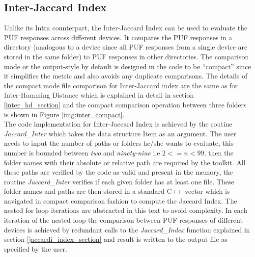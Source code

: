 \subsection{Inter-Jaccard Index}
Unlike its Intra counterpart, the Inter-Jaccard Index can be used to evaluate the PUF responses across different devices. It compares the PUF responses in a directory (analogous to a device since all PUF responses from a single device are stored in the same folder) to PUF responses in other directories. The comparison mode or the output-style by default is designed in the code to be ``compact'' since it simplifies the metric and also avoids any duplicate comparisons. The details of
the compact mode file comparison for Inter-Jaccard index are the same as for Inter-Hamming Distance which is explained in detail in section \ref{inter_hd_section} and the  compact comparison operation between three folders is shown in Figure \ref{img:inter_compact}.\\

The code implementation for Inter-Jaccard Index is achieved by the routine \emph{Jaccard\_Inter} which takes the data structure Item as an argument. The user needs to input the number of paths or folders he/she wants to evaluate, this number is bounded between \emph{two} and \emph{ninety-nine} i.e $2 <= n < 99$, then the folder names with their absolute or relative path are required by the toolkit. All these paths are verified by the code as valid and present in the memory, the
routine \emph{Jaccard\_Inter} verifies if each given folder has at least one file. These folder names and paths are then stored in a standard C++ vector which is navigated in compact comparison fashion to compute the Jaccard Index. The nested for loop iterations are abstracted in this text to avoid complexity. In each iteration of the nested loop the comparison between PUF responses of different devices is achieved by redundant calls to the \emph{Jaccard\_Index} function explained in section
\ref{jaccardi_index_section} and result is written to the output file as specified by the user.\\

